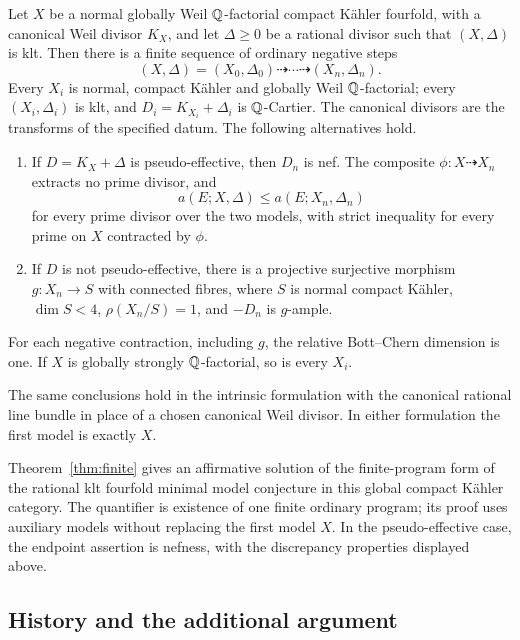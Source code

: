\begin{theorem}\label{thm:finite}
Let $X$ be a normal globally Weil $\mathbb Q$-factorial compact Kähler
fourfold, with a canonical Weil divisor $K_X$, and let $\Delta\geq0$
be a rational divisor such that $(X,\Delta)$ is klt. Then there is a
finite sequence of ordinary negative steps
\[
 (X,\Delta)=(X_0,\Delta_0)\dashrightarrow\cdots
 \dashrightarrow(X_n,\Delta_n).
\]
Every $X_i$ is normal, compact Kähler and globally Weil
$\mathbb Q$-factorial; every $(X_i,\Delta_i)$ is klt, and
$D_i=K_{X_i}+\Delta_i$ is $\mathbb Q$-Cartier. The canonical divisors are
the transforms of the specified datum. The following alternatives hold.
\begin{enumerate}[label=\textup{(\roman*)}]
\item If $D=K_X+\Delta$ is pseudo-effective, then $D_n$ is nef.
The composite $\phi:X\dashrightarrow X_n$ extracts no prime divisor,
and
\[
 a(E;X,\Delta)\leq a(E;X_n,\Delta_n)
\]
for every prime divisor over the two models, with strict inequality
for every prime on $X$ contracted by $\phi$.
\item If $D$ is not pseudo-effective, there is a projective surjective
morphism $g:X_n\to S$ with connected fibres, where $S$ is normal
compact Kähler, $\dim S<4$, $\rho(X_n/S)=1$, and $-D_n$ is
$g$-ample.
\end{enumerate}
For each negative contraction, including $g$, the relative
Bott--Chern dimension is one. If $X$ is globally strongly
$\mathbb Q$-factorial, so is every $X_i$.

The same conclusions hold in the intrinsic formulation with the
canonical rational line bundle in place of a chosen canonical Weil
divisor. In either formulation the first model is exactly $X$.
\end{theorem}

Theorem~\ref{thm:finite} gives an affirmative solution of the
finite-program form of the rational klt fourfold minimal model
conjecture in this global compact Kähler category. The quantifier is
existence of one finite ordinary program; its proof uses auxiliary
models without replacing the first model $X$. In the pseudo-effective
case, the endpoint assertion is nefness, with the discrepancy properties
displayed above.

\subsection{History and the additional argument}

